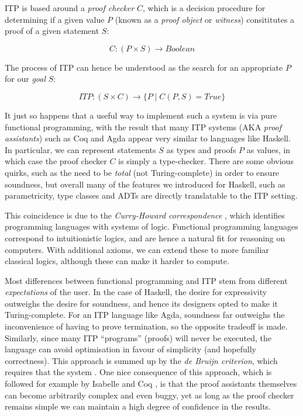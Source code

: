 \documentclass[]{article}
\begin{document}
ITP is based around a \emph{proof checker} $C$, which is a decision procedure for determining if a given value $P$ (known as a \emph{proof object} or \emph{witness}) consititutes a proof of a given statement $S$:

$$ C \colon (P \times S) \rightarrow Boolean $$

The process of ITP can hence be understood as the search for an appropriate $P$ for our \emph{goal} $S$:

$$ ITP \colon (S \times C) \rightarrow \{ P \mid C(P, S) = True \} $$

It just so happens that a useful way to implement such a system is via pure functional programming, with the result that many ITP systems (AKA \emph{proof assistants}) such as Coq and Agda appear very similar to languages like Haskell. In particular, we can represent statements $S$ as types and proofs $P$ as values, in which case the proof checker $C$ is simply a type-checker. There are some obvious quirks, such as the need to be \emph{total} (not Turing-complete) in order to ensure soundness, but overall many of the features we introduced for Haskell, such as parametricity, type classes and ADTs are directly translatable to the ITP setting.

This coincidence is due to the \emph{Curry-Howard correspondence} \cite{wadler2015propositions}, which identifies programming languages with systems of logic. Functional programming languages correspond to intuitionistic logics, and are hence a natural fit for reasoning on computers. With additional axioms, we can extend these to more familiar classical logics, although these can make it harder to compute.

Most differences between functional programming and ITP stem from different \emph{expectations} of the user. In the case of Haskell, the desire for expressivity outweighs the desire for soundness, and hence its designers opted to make it Turing-complete. For an ITP language like Agda, soundness far outweighs the inconvenience of having to prove termination, so the opposite tradeoff is made. Similarly, since many ITP ``programs'' (proofs) will never be executed, the language can avoid optimisation in favour of simplicity (and hopefully correctness). This approach is summed up by the \emph{de Bruijn criterion}, which requires that the system  \cite[\S~2]{barendregt2001proof}. One nice consequence of this approach, which is followed for example by Isabelle \cite{nipkow2002isabelle} and Coq \cite{bertot2013interactive}, is that the proof assistants themselves can become arbitrarily complex and even buggy, yet as long as the proof checker remains simple we can maintain a high degree of confidence in the results.
\end{document}
